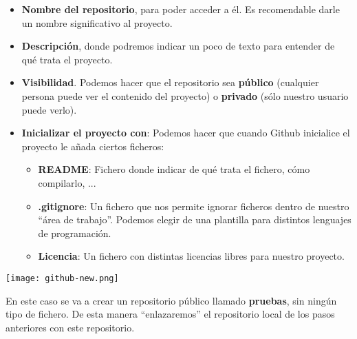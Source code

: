 \begin{itemize}
    \item \textbf{Nombre del repositorio}, para poder acceder a él. Es recomendable darle un nombre significativo al proyecto.
    \item \textbf{Descripción}, donde podremos indicar un poco de texto para entender de qué trata el proyecto.
    \item \textbf{Visibilidad}. Podemos hacer que el repositorio sea \textbf{público} (cualquier persona puede ver el contenido del proyecto) o \textbf{privado} (sólo nuestro usuario puede verlo).

    \item \textbf{Inicializar el proyecto con}: Podemos hacer que cuando Github inicialice el proyecto le añada ciertos ficheros:
    \begin{itemize}
        \item \textbf{README}: Fichero donde indicar de qué trata el fichero, cómo compilarlo, ...
        \item \textbf{.gitignore}: Un fichero que nos permite ignorar ficheros dentro de nuestro “área de trabajo”. Podemos elegir de una plantilla para distintos lenguajes de programación.
        \item \textbf{Licencia}: Un fichero con distintas licencias libres para nuestro proyecto.
    \end{itemize}
\end{itemize}


\begin{center}
    \texttt{[image: github-new.png]}
\end{center}

En este caso se va a crear un repositorio público llamado \textbf{pruebas}, sin ningún tipo de fichero. De esta manera “enlazaremos” el repositorio local de los pasos anteriores con este repositorio.